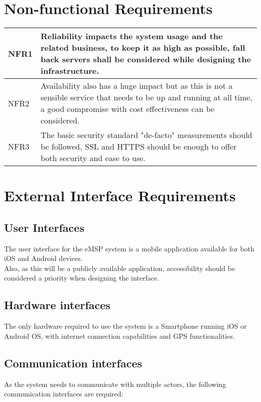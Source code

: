 \section{Non-functional Requirements}

{
\setlength\extrarowheight{5pt}
\begin{tabular}{|p{3cm}|p{10cm}|}
	\hline
	NFR1 & Reliability impacts the system usage and the related business,
		to keep it as high as possible, fall back servers shall be considered while designing the infrastructure.	\\
	\hline
	NFR2 & Availability also has a huge impact but as this is not a sensible service that needs to be up and running at all time, a good compromise with cost effectiveness can be considered. \\
	\hline
	NFR3 & The basic security standard "de-facto" measurements should be followed, SSL and HTTPS should be enough to offer both security and ease to use.\\
	\hline
\end{tabular}
}

\clearpage
\newpage



\section{External Interface Requirements}
\subsection{User Interfaces}
The user interface for the eMSP system is a mobile application available for both iOS and Android devices.\\
Also, as this will be a publicly available application, accessibility should be considered a priority when designing the interface.

\subsection{Hardware interfaces}
The only hardware required to use the system is a Smartphone running iOS or Android OS, with internet connection capabilities and GPS functionalities.

\subsection{Communication interfaces}
As the system needs to communicate with multiple actors, the following communication interfaces are required:

